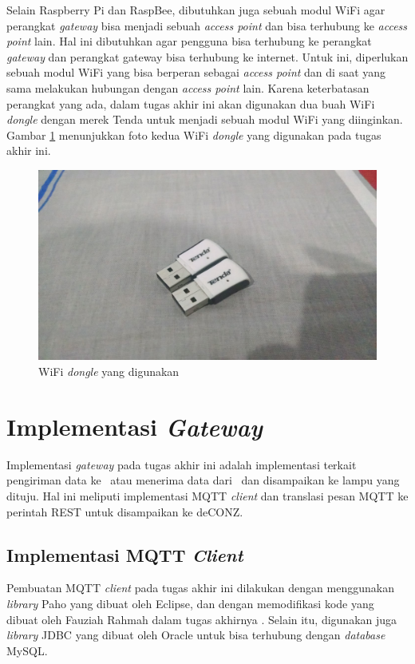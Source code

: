 Selain Raspberry Pi dan RaspBee, dibutuhkan juga sebuah modul WiFi agar perangkat \textit{gateway} bisa menjadi sebuah \textit{access point} dan bisa terhubung ke \textit{access point} lain. Hal ini dibutuhkan agar pengguna bisa terhubung ke perangkat \textit{gateway} dan perangkat gateway bisa terhubung ke internet. Untuk ini, diperlukan sebuah modul WiFi yang bisa berperan sebagai \textit{access point} dan di saat yang sama melakukan hubungan dengan \textit{access point} lain. Karena keterbatasan perangkat yang ada, dalam tugas akhir ini akan digunakan dua buah WiFi \textit{dongle} dengan merek Tenda untuk menjadi sebuah modul WiFi yang diinginkan. Gambar \ref{fig:tenda} menunjukkan foto kedua WiFi \textit{dongle} yang digunakan pada tugas akhir ini.
\begin{figure}
	\centering
	\includegraphics[width=.9\textwidth]{pics/tenda.jpg}
	\caption{WiFi \textit{dongle} yang digunakan}
	\label{fig:tenda}
\end{figure}

\section{Implementasi \textit{Gateway}}
Implementasi \textit{gateway} pada tugas akhir ini adalah implementasi terkait pengiriman data ke \plat~atau menerima data dari \plat~dan disampaikan ke lampu yang dituju. Hal ini meliputi implementasi MQTT \textit{client} dan translasi pesan MQTT ke perintah REST untuk disampaikan ke deCONZ.

\subsection{Implementasi MQTT \textit{Client}}
Pembuatan MQTT \textit{client} pada tugas akhir ini dilakukan dengan menggunakan \textit{library} Paho yang dibuat oleh Eclipse, dan dengan memodifikasi kode yang dibuat oleh Fauziah Rahmah dalam tugas akhirnya \cite{SkripsiFarah}. Selain itu, digunakan juga \textit{library} JDBC yang dibuat oleh Oracle untuk bisa terhubung dengan \textit{database} MySQL.

